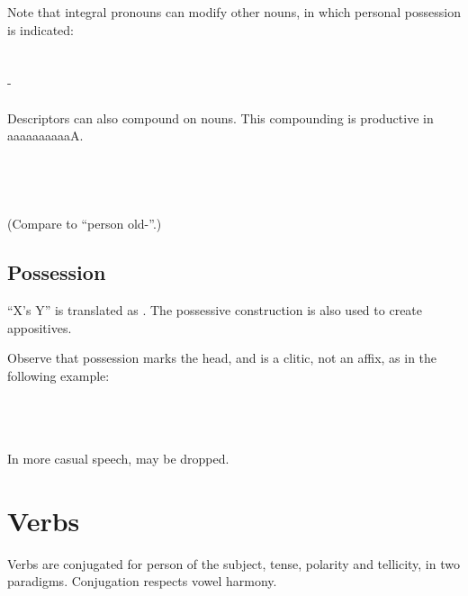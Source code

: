 \documentclass{book}
\newcommand{\lname}{aaaaaaaaaaA}
\begin{document}
Note that integral pronouns can modify other nouns, in which personal possession is indicated: \\
~\\
 \\
- \\
    \\

Descriptors can also compound on nouns. This compounding is productive in \lname. \\
~\\
 \\
 \\
  \\
(Compare to  ``person old-''.)

\section{Possession}

``X's Y'' is translated as . The possessive construction is also used to create appositives.

Observe that possession marks the head, and  is a clitic, not an affix, as in the following example: \\
~\\
 \\
   \\
 

In more casual speech,  may be dropped.

\chapter{Verbs}

Verbs are conjugated for person of the subject, tense, polarity and tellicity, in two paradigms. Conjugation respects vowel harmony.
\end{document}
